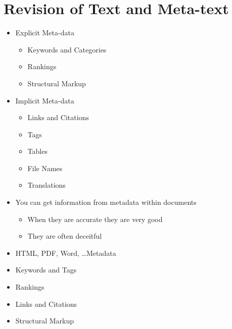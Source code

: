 \documentclass[a4paper,landscape,headrule,footrule,xetex]{foils}
\begin{document}


\maketitle


%

\section{Revision of Text and Meta-text}

\begin{itemize}
\item Explicit Meta-data
  \begin{itemize}
  \item Keywords and Categories
  \item Rankings
  \item Structural Markup
  \end{itemize}
\item Implicit Meta-data
  \begin{itemize}
  \item Links and Citations
  \item Tags
  \item Tables
  \item File Names
  \item Translations
  \end{itemize}
\end{itemize}

\MyLogo{}
\begin{itemize}
\item You can get information from metadata within documents
  \begin{itemize}
  \item When they are accurate they are very good
  \item They are often deceitful
  \end{itemize}
\item HTML, PDF, Word, \ldots Metadata
\item Keywords and Tags
\item Rankings
\item Links and Citations
\item Structural Markup
\end{itemize}
\end{document}
